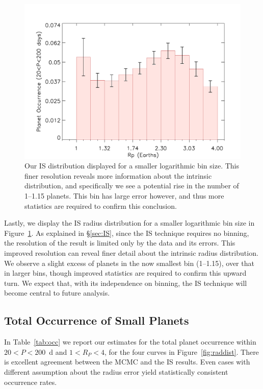\begin{figure}
\centerline{\includegraphics[scale=0.55]{chap2/Silburt_ISnobin.pdf}}
\caption{Our IS distribution displayed for a smaller logarithmic 
 bin size. This finer resolution reveals more information about
 the intrinsic distribution, and specifically we see a potential
 rise in the number of 1--1.15\rearth{} planets. This bin has large 
 error however, and thus more statistics are required to confirm this 
 conclusion.}
\label{fig:isnobin}
\end{figure}

Lastly, we display the IS radius distribution for a smaller
logarithmic bin size in Figure~\ref{fig:isnobin}. As explained in 
\S\ref{sec:IS}, since the IS technique requires no binning, the 
resolution of the result is limited only by the data and its errors. 
This improved resolution can reveal finer detail about the intrinsic 
radius distribution. We observe a slight excess of planets in the now 
smallest bin (1--1.15\rearth{}), over that in larger bins, though improved 
statistics are required to confirm this upward turn.  We
expect that, with its independence on binning, the IS technique will
become central to future analysis.


\subsection{Total Occurrence of Small Planets}
\label{sec:totaloccur}
In Table~\ref{tab:occ} we report our estimates for the total planet
occurrence within $20 < P < 200$~d and $1 < R_P < 4$\rearth{}, for
the four curves in Figure~\ref{fig:raddist}. There is excellent
agreement between the MCMC and the IS results. Even cases with
different assumption about the radius error yield statistically
consistent occurrence rates.

